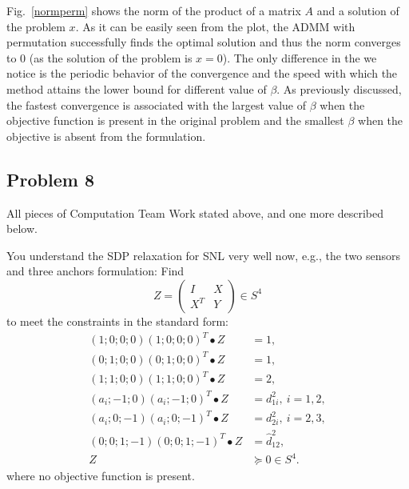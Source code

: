 \documentclass[answers]{exam}
\begin{document}
\begin{itemize}
\begin{framed}
Fig.~\ref{normperm} shows the norm of the product of a matrix $A$  and a solution of the problem $x$. As it can be easily seen from the plot, the ADMM with permutation successfully finds the optimal solution and thus the norm converges to 0 (as the solution of the problem is $x=0$). The only difference in the we notice is the periodic behavior of the convergence and the speed with which the method attains the lower bound for different value of $\beta$. As previously discussed, the fastest convergence is associated with the largest value of $\beta$ when the objective function is present in the original problem and the smallest $\beta$ when the objective is absent from the formulation.
~\\


\end{framed}
\end{itemize}

\newpage

\subsection*{Problem 8}
All pieces of Computation Team Work stated above, and one more described below.

You understand the SDP relaxation for SNL very well now, e.g., the two sensors and three anchors formulation: Find
\[Z=\left(\begin{array}{cc}
              I & X\\
              X^T& Y\end{array}\right)\in S^4
\]
to meet the constraints in the standard form:
\[\begin{array}{cl}
(1;0;0;0)(1;0;0;0)^T\bullet Z &=1,\\
(0;1;0;0)(0;1;0;0)^T\bullet Z& =1,\\
(1;1;0;0)(1;1;0;0)^T\bullet Z& =2,\\
(a_i;-1;0)(a_i;-1;0)^T\bullet Z &= d^2_{1i},\ i=1,2,\\
(a_i;0;-1)(a_i;0;-1)^T\bullet Z &= d^2_{2i},\ i=2,3,\\
(0;0;1;-1)(0;0;1;-1)^T\bullet Z&=\hat{d}^2_{12},\\
Z &\succeq 0\in S^4.
\end{array}
\]
where no objective function is present. 
\end{document}

